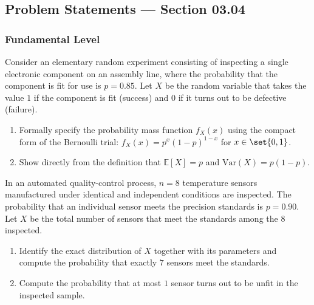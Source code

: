 
\subsection*{Problem Statements --- Section 03.04}

\subsubsection*{Fundamental Level}

\begin{problema}
	\label{prob:3.4.1}
	Consider an elementary random experiment consisting of inspecting a single electronic component on an assembly line, where the probability that the component is fit for use is $p = 0.85$. Let $X$ be the random variable that takes the value $1$ if the component is fit (success) and $0$ if it turns out to be defective (failure).
	\begin{enumerate}
		\item Formally specify the probability mass function $f_X(x)$ using the compact form of the Bernoulli trial: $f_X(x) = p^x (1-p)^{1-x}$ for $x \in \set{0, 1}$.
		\item Show directly from the definition that $\mathbb{E}[X] = p$ and $\text{Var}(X) = p(1-p)$.
	\end{enumerate}
\end{problema}

\begin{problema}
	\label{prob:3.4.2}
	In an automated quality-control process, $n = 8$ temperature sensors manufactured under identical and independent conditions are inspected. The probability that an individual sensor meets the precision standards is $p = 0.90$. Let $X$ be the total number of sensors that meet the standards among the $8$ inspected.
	\begin{enumerate}
		\item Identify the exact distribution of $X$ together with its parameters and compute the probability that exactly $7$ sensors meet the standards.
		\item Compute the probability that at most $1$ sensor turns out to be unfit in the inspected sample.
	\end{enumerate}
\end{problema}

